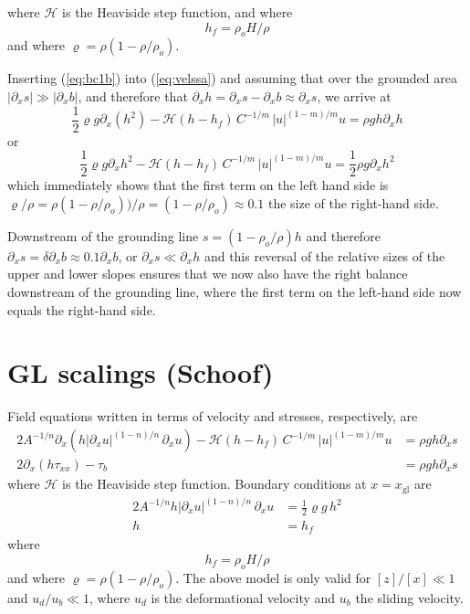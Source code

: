 \documentclass[10pt,a4paper]{book}
\newcommand{\He}{\mathcal{H}}
\newcommand{\p}{\partial}
\newcommand{\txx}{\tau_{xx}}
\newcommand{\xgl}{x_{\mathrm{gl}}}
\begin{document}
where $\He$ is the Heaviside step function, and
where
\[
h_f=\rho_o H/\rho
\]
and where $\varrho=\rho (1-\rho/\rho_o)$. 

Inserting (\ref{eq:bc1b}) into (\ref{eq:velssa}) and assuming that over the grounded area 
$ |\p_x s| \gg |\p_x b|$, and therefore that $\p_x h = \p_x s - \p_x b \approx \p_x s $, we arrive at
\[
\frac{1}{2} \varrho g \p_x \left ( h^2  \right ) - \He(h-h_f) \, C^{-1/m} \, |u|^{(1-m)/m} u = \rho g h \p_x h  \label{eq:velssa2}
\]
or
\[
\frac{1}{2} \varrho g \p_x  h^2  - \He(h-h_f) \, C^{-1/m} \, |u|^{(1-m)/m} u = \frac{1}{2} \rho g  \p_x h^2  \label{eq:velssa3}
\]
which immediately shows that the first term on the left hand side is
$\varrho /\rho=\rho (1-\rho/\rho_o))/\rho=(1-\rho/\rho_o) \approx 0.1 $
the size of the right-hand side.

Downstream of the grounding line $s=(1-\rho_o/\rho) h$ and therefore
$\p_x s = \delta \p_x b \approx 0.1 \p_x b$, or
$\p_x s \ll \p_x h $ and this reversal of the relative sizes of the upper
and lower slopes ensures that we now also have the right balance
downstream of the grounding line, where the first term on the left-hand side now equals the right-hand side.




\section{GL scalings  (Schoof)}

\setcounter{equation}{0}
Field equations written in terms of velocity and stresses, respectively, are
\begin{align}
2 A^{-1/n} \p_x \left (h |\p_x u|^{(1-n)/n} \, \p_x u \right ) - \He(h-h_f) \, C^{-1/m} \, |u|^{(1-m)/m} u & = \rho g h \p_x s  \label{eq:vel}\\
     2 \p_x \left ( h \txx \right )  - \tau_b & = \rho g h \p_x s  \label{eq:stress} 
\end{align}
where $\He$ is the Heaviside step function.
Boundary conditions at $x=\xgl$ are
\begin{align}
2 A^{-1/n} h |\p_x u|^{(1-n)/n}   \, \p_x u & = \frac{1}{2} \varrho g \, h^2  \label{eq:bc1c} \\
h&=h_f   \label{eq:bc2c}
\end{align}
where
\[
h_f=\rho_o H/\rho
\]
and where $\varrho=\rho (1-\rho/\rho_o)$. The above model is only valid for $[z]/[x] \ll 1 $
and $u_d/u_b\ll 1$, where $u_d$ is the deformational velocity and
$u_b$ the sliding velocity.
\end{document}
